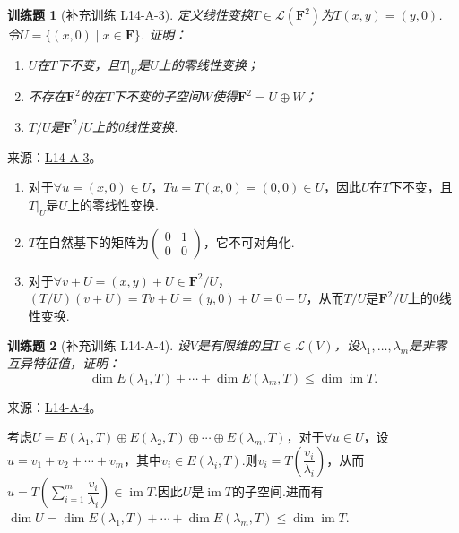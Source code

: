 \documentclass[12pt,fontset=fandol]{ctexart}
\newtheorem{exercise}{训练题}[section]
\begin{document}
\begin{exercise}[补充训练 L14-A-3]\label{prob:L14-A-3}
定义线性变换$T\in \mathcal{L}(\mathbf{F}^2)$为$T(x,y)=(y,0)$. 令$U=\{(x,0) \mid x\in\mathbf{F}\}$. 证明：
        \begin{enumerate}
            \item $U$在$T$下不变，且$T|_{U}$是$U$上的零线性变换；

            \item 不存在$\mathbf{F}^2$的在$T$下不变的子空间$W$使得$\mathbf{F}^2=U\oplus W$；

            \item $T/U$是$\mathbf{F}^2/U$上的0线性变换.
        \end{enumerate}
\end{exercise}
\noindent 来源：\href{https://github.com/yhwu-is/Linear-Algebra-Left-Undone/blob/new/%E8%AE%B2%E4%B9%89/%E4%B8%93%E9%A2%98/14%20%E7%9B%B8%E4%BC%BC%E6%A0%87%E5%87%86%E5%BD%A2%EF%BC%9A%E5%8A%A8%E6%9C%BA%E4%B8%8E%E5%9F%BA%E7%A1%80.tex}{L14-A-3}。
\begin{solve}
\begin{enumerate}
                \item 对于$\forall u=(x,0)\in U$，$Tu=T(x,0)=(0,0)\in U$，因此$U$在$T$下不变，且$T|_{U}$是$U$上的零线性变换.
                \item $T$在自然基下的矩阵为$\begin{pmatrix}
                    0 & 1 \\ 0 & 0
                \end{pmatrix}$，它不可对角化.
                \item 对于$\forall v+U=(x,y)+U\in \mathbf{F}^2/U$，$(T/U)(v+U)=Tv+U=(y,0)+U=0+U$，从而$T/U$是$\mathbf{F}^2/U$上的$0$线性变换.
            \end{enumerate}
\end{solve}

\begin{exercise}[补充训练 L14-A-4]\label{prob:L14-A-4}
设$V$是有限维的且$T\in \mathcal{L}(V)$，设$\lambda_1,\ldots,\lambda_m$是非零互异特征值，证明：
        \[ \dim E(\lambda_1,T)+\cdots+\dim E(\lambda_m,T)\leqslant\dim\operatorname{im} T. \]
\end{exercise}
\noindent 来源：\href{https://github.com/yhwu-is/Linear-Algebra-Left-Undone/blob/new/%E8%AE%B2%E4%B9%89/%E4%B8%93%E9%A2%98/14%20%E7%9B%B8%E4%BC%BC%E6%A0%87%E5%87%86%E5%BD%A2%EF%BC%9A%E5%8A%A8%E6%9C%BA%E4%B8%8E%E5%9F%BA%E7%A1%80.tex}{L14-A-4}。
\begin{solve}
考虑$U=E(\lambda_1,T)\oplus E(\lambda_2,T) \oplus \cdots \oplus E(\lambda_m,T)$，对于$\forall u\in U$，设$u=v_1+v_2+\cdots+v_m$，其中$v_i\in E(\lambda_i,T)$.则$v_i=T(\dfrac{v_i}{\lambda_i})$，从而$u=T(\sum\limits_{i=1}^{m}\dfrac{v_i}{\lambda_i}) \in \operatorname{im} T$.因此$U$是$\operatorname{im} T$的子空间.进而有$\dim U=\dim E(\lambda_1,T)+\cdots+\dim E(\lambda_m,T) \leqslant \dim \operatorname{im} T$.
\end{solve}
\end{document}
